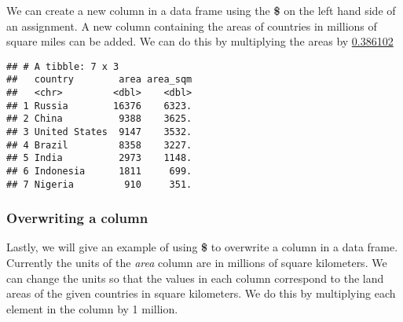 \documentclass[]{book}
\newenvironment{Shaded}{\begin{snugshade}}{\end{snugshade}}
\newcommand{\FloatTok}[1]{\textcolor[rgb]{0.00,0.00,0.81}{#1}}
\newcommand{\NormalTok}[1]{#1}
\newcommand{\OperatorTok}[1]{\textcolor[rgb]{0.81,0.36,0.00}{\textbf{#1}}}
\newcommand{\StringTok}[1]{\textcolor[rgb]{0.31,0.60,0.02}{#1}}
\begin{document}
\hypertarget{dollarsignnew}{%
\subsubsection*{}\label{dollarsignnew}}

We can create a new column in a data frame using the \textbf{\$} on the left hand side of an assignment. A new column containing the areas of countries in millions of square miles can be added. We can do this by multiplying the areas by \href{https://www.google.com/search?q=how+many+square+miles+in+a+square+kilometer}{0.386102}

\begin{Shaded}
\end{Shaded}

\begin{verbatim}
## # A tibble: 7 x 3
##   country        area area_sqm
##   <chr>         <dbl>    <dbl>
## 1 Russia        16376    6323.
## 2 China          9388    3625.
## 3 United States  9147    3532.
## 4 Brazil         8358    3227.
## 5 India          2973    1148.
## 6 Indonesia      1811     699.
## 7 Nigeria         910     351.
\end{verbatim}

\hypertarget{overwriteds}{%
\subsubsection*{Overwriting a column}\label{overwriteds}}

Lastly, we will give an example of using \textbf{\$} to overwrite a column in a data frame. Currently the units of the \emph{area} column are in millions of square kilometers. We can change the units so that the values in each column correspond to the land areas of the given countries in square kilometers. We do this by multiplying each element in the column by 1 million.

\begin{Shaded}
\end{Shaded}
\end{document}
